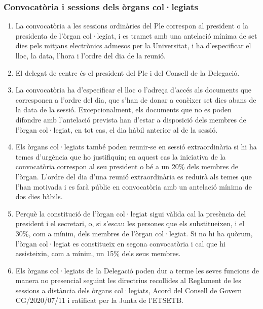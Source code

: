\documentclass[a4paper,12pt]{article}
\renewcommand*{\thesubsubsection}{\arabic{subsubsection}}
\begin{document}
\subsubsection{Convocatòria i sessions dels òrgans col·legiats}\label{art:convocatories}
\begin{enumerate}[\thesubsubsection.1]
	\item La convocatòria a les sessions ordinàries del Ple correspon al president o la presidenta de l'òrgan col·legiat, i es tramet amb una antelació mínima de set dies pels mitjans electrònics admesos per la Universitat, i ha d'especificar el lloc, la data, l'hora i l'ordre del dia de la reunió.
	\item El delegat de centre és el president del Ple i del Consell de la Delegació.
	\item La convocatòria ha d'especificar el lloc o l'adreça d'accés als documents que corresponen a l'ordre del dia, que s'han de donar a conèixer set dies abans de la data de la sessió. Excepcionalment, els documents que no es poden difondre amb l'antelació prevista han d'estar a disposició dels membres de l'òrgan col·legiat, en tot cas, el dia hàbil anterior al de la sessió.
	\item Els òrgans col·legiats també poden reunir-se en sessió extraordinària si hi ha temes d'urgència que ho justifiquin; en aquest cas la iniciativa de la convocatòria correspon al seu president o bé a un 20\% dels membres de l'òrgan.\label{art:extraordinaries}
	L'ordre del dia d'una reunió extraordinària es reduirà als temes que l'han motivada i es farà públic en convocatòria amb un antelació mínima de dos dies hàbils.
	\item Perquè la constitució de l'òrgan col·legiat sigui vàlida cal la presència del president i el secretari, o, si s'escau les persones que els substitueixen, i el 30\%, com a mínim, dels membres de l'òrgan col·legiat. Si no hi ha quòrum, l'òrgan col·legiat es constitueix en segona convocatòria i cal que hi assisteixin, com a mínim, un 15\% dels seus membres.\label{art:constitucio}
	\item Els òrgans col·legiats de la Delegació poden dur a terme les seves funcions de manera no presencial seguint les directrius recollides al Reglament de les sessions a distància dels òrgans col·legiats, Acord del Consell de Govern CG/2020/07/11 i ratificat per la Junta de l'ETSETB.
\end{enumerate}
\end{document}
